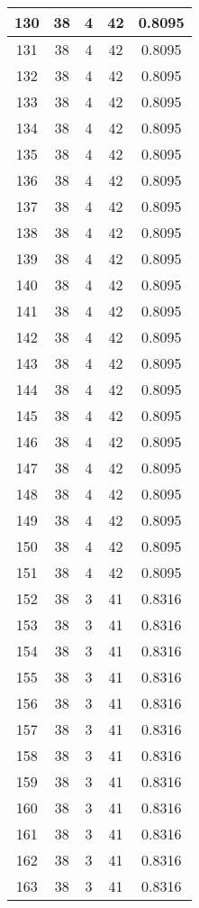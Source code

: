 \documentclass[letterpaper, 12pt]{article}
\begin{document}
\begin{longtable}{|c|c|c|c|c|}
\hline
130 & 38 & 4 & 42 & 0.8095 \\
\hline
131 & 38 & 4 & 42 & 0.8095 \\
\hline
132 & 38 & 4 & 42 & 0.8095 \\
\hline
133 & 38 & 4 & 42 & 0.8095 \\
\hline
134 & 38 & 4 & 42 & 0.8095 \\
\hline
135 & 38 & 4 & 42 & 0.8095 \\
\hline
136 & 38 & 4 & 42 & 0.8095 \\
\hline
137 & 38 & 4 & 42 & 0.8095 \\
\hline
138 & 38 & 4 & 42 & 0.8095 \\
\hline
139 & 38 & 4 & 42 & 0.8095 \\
\hline
140 & 38 & 4 & 42 & 0.8095 \\
\hline
141 & 38 & 4 & 42 & 0.8095 \\
\hline
142 & 38 & 4 & 42 & 0.8095 \\
\hline
143 & 38 & 4 & 42 & 0.8095 \\
\hline
144 & 38 & 4 & 42 & 0.8095 \\
\hline
145 & 38 & 4 & 42 & 0.8095 \\
\hline
146 & 38 & 4 & 42 & 0.8095 \\
\hline
147 & 38 & 4 & 42 & 0.8095 \\
\hline
148 & 38 & 4 & 42 & 0.8095 \\
\hline
149 & 38 & 4 & 42 & 0.8095 \\
\hline
150 & 38 & 4 & 42 & 0.8095 \\
\hline
151 & 38 & 4 & 42 & 0.8095 \\
\hline
152 & 38 & 3 & 41 & 0.8316 \\
\hline
153 & 38 & 3 & 41 & 0.8316 \\
\hline
154 & 38 & 3 & 41 & 0.8316 \\
\hline
155 & 38 & 3 & 41 & 0.8316 \\
\hline
156 & 38 & 3 & 41 & 0.8316 \\
\hline
157 & 38 & 3 & 41 & 0.8316 \\
\hline
158 & 38 & 3 & 41 & 0.8316 \\
\hline
159 & 38 & 3 & 41 & 0.8316 \\
\hline
160 & 38 & 3 & 41 & 0.8316 \\
\hline
161 & 38 & 3 & 41 & 0.8316 \\
\hline
162 & 38 & 3 & 41 & 0.8316 \\
\hline
163 & 38 & 3 & 41 & 0.8316 \\

\end{longtable}
\end{document}
